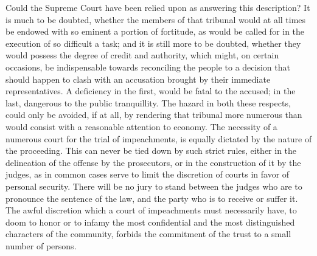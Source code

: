 Could the Supreme Court have been relied upon as answering this description? 
It is much to be doubted, whether the members of that tribunal would at all times be endowed with so eminent a portion of fortitude, as would be called for in the execution of so difficult a task; and it is still more to be doubted, whether they would possess the degree of credit and authority, which might, on certain occasions, be indispensable towards reconciling the people to a decision that should happen to clash with an accusation brought by their immediate representatives. 
A deficiency in the first, would be fatal to the accused; in the last, dangerous to the public tranquillity. 
The hazard in both these respects, could only be avoided, if at all, by rendering that tribunal more numerous than would consist with a reasonable attention to economy. 
The necessity of a numerous court for the trial of impeachments, is equally dictated by the nature of the proceeding. 
This can never be tied down by such strict rules, either in the delineation of the offense by the prosecutors, or in the construction of it by the judges, as in common cases serve to limit the discretion of courts in favor of personal security. 
There will be no jury to stand between the judges who are to pronounce the sentence of the law, and the party who is to receive or suffer it. 
The awful discretion which a court of impeachments must necessarily have, to doom to honor or to infamy the most confidential and the most distinguished characters of the community, forbids the commitment of the trust to a small number of persons.

